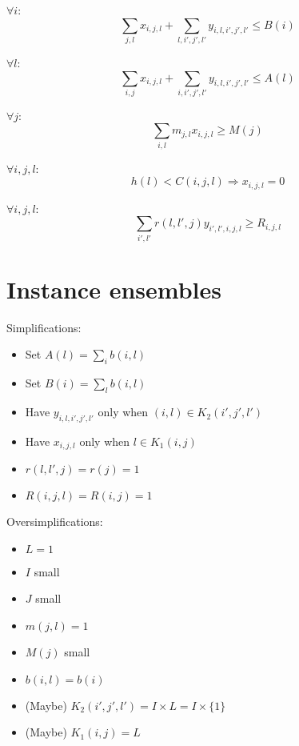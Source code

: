 \documentclass{article}
\begin{document}
$\forall i$:
\begin{equation}
\sum_{j, l} x_{i,j,l} + \sum_{l, i', j', l'} y_{i, l, i', j', l'} \leq B(i)
\end{equation}

$\forall l$:
\begin{equation}
\sum_{i, j} x_{i, j, l} + \sum_{i, i', j', l'} y_{i, l, i', j', l'} \leq A(l)
\end{equation}

$ \forall j$:
\begin{equation}
\sum_{i, l} m_{j, l} x_{i, j, l} \geq M(j) 
\end{equation}

$\forall i, j, l$:
\begin{equation}
h(l) < C(i, j, l) \Rightarrow x_{i, j, l} = 0
\end{equation}

$\forall i, j, l$:
\begin{equation}
\sum_{i', l'} r(l, l', j) y_{i', l', i, j, l} \geq R_{i, j, l}
\end{equation}

\section{Instance ensembles}
Simplifications:
\begin{itemize}
    \item Set $A(l) = \sum_{i} b(i, l)$
    \item Set $B(i) = \sum_{l} b(i, l)$
    \item Have $y_{i,l,i',j',l'}$ only when $(i, l) \in K_2(i', j', l')$
    \item Have $x_{i, j, l}$ only when $l \in K_1(i, j)$
    \item $r(l, l', j) = r(j) = 1$
    \item $R(i, j, l) = R(i, j) = 1$
\end{itemize}

\noindent
Oversimplifications:
\begin{itemize}
\item $L = 1$
\item $I$ small
\item $J$ small
\item $m(j, l) = 1$
\item $M(j)$ small 
\item $b(i, l) = b(i)$
\item (Maybe) $K_2(i', j', l') = I \times L = I \times \{1\}$
\item (Maybe) $K_1(i, j) = L$
\end{itemize}
\end{document}
